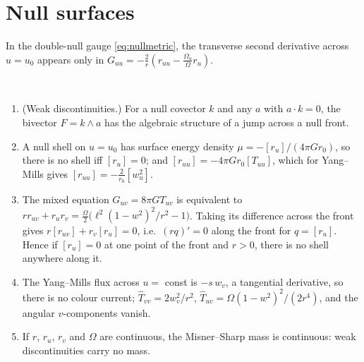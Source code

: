 \section{Null surfaces}

In the double-null gauge \eqref{eq:nullmetric}, the transverse second derivative across $u=u_0$ appears only in $G_{uu}=-\frac2r(r_{uu}-\frac{\Omega_u}\Omega r_u)$.

\begin{theorem}\label{thm:null}\ver\
\begin{enumerate}[label=(\roman*)]
\item (Weak discontinuities.) For a null covector $k$ and any $a$ with $a\cdot k=0$, the bivector $F=k\wedge a$ has the algebraic structure of a jump across a null front.
\item A null shell on $u=u_0$ has surface energy density $\mu=-[r_u]/(4\pi Gr_0)$, so there is no shell iff $[r_u]=0$; and $[r_{uu}]=-4\pi Gr_0[T_{uu}]$, which for Yang--Mills gives $[r_{uu}]=-\frac2{r_0}[w_u^2]$.
\item The mixed equation $G_{uv}=8\pi GT_{uv}$ is equivalent to $rr_{uv}+r_ur_v=\frac\Omega2\bigl(\ell^2(1-w^2)^2/r^2-1\bigr)$. Taking its difference across the front gives $r[r_{uv}]+r_v[r_u]=0$, i.e.\ $(rq)'=0$ along the front for $q=[r_u]$. Hence if $[r_u]=0$ at one point of the front and $r>0$, there is no shell anywhere along it.
\item The Yang--Mills flux across $u=$ const is $-s\,w_v$, a tangential derivative, so there is no colour current; $\hat T_{vv}=2w_v^2/r^2$, $\hat T_{uv}=\Omega(1-w^2)^2/(2r^4)$, and the angular $v$-components vanish.
\item If $r$, $r_u$, $r_v$ and $\Omega$ are continuous, the Misner--Sharp mass is continuous: weak discontinuities carry no mass.
\end{enumerate}
\end{theorem}
